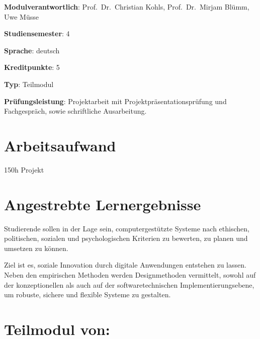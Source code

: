 \begin{modulHead}
\textbf{Modulverantwortlich}: Prof.~Dr.~Christian
Kohls, Prof.~Dr.~Mirjam Blümm, Uwe
Müsse
\end{modulHead}
\begin{modulHead}
\textbf{Studiensemester}:
4
\end{modulHead}
\begin{modulHead}
\textbf{Sprache}:
deutsch
\end{modulHead}
\begin{modulHead}
\textbf{Kreditpunkte}:
5
\end{modulHead}
\begin{modulHead}
\textbf{Typ}:
Teilmodul
\end{modulHead}
\begin{modulHead}
\textbf{Prüfungsleistung}:
Projektarbeit mit Projektpräsentationsprüfung und Fachgespräch, sowie
schriftliche Ausarbeitung.
\end{modulHead}


\hypertarget{arbeitsaufwandpathlabelmi-2017modulbeschreibungen-bachelorba_sc_projekt}{%
\section*{Arbeitsaufwand\label{/mi-2017/modulbeschreibungen-bachelor/BA_SC_Projekt}}\label{arbeitsaufwandpathlabelmi-2017modulbeschreibungen-bachelorba_sc_projekt}}

150h Projekt

\hypertarget{angestrebte-lernergebnissepathlabelmi-2017modulbeschreibungen-bachelorba_sc_projekt}{%
\section*{Angestrebte
Lernergebnisse\label{/mi-2017/modulbeschreibungen-bachelor/BA_SC_Projekt}}\label{angestrebte-lernergebnissepathlabelmi-2017modulbeschreibungen-bachelorba_sc_projekt}}

Studierende sollen in der Lage sein, computergestützte Systeme nach
ethischen, politischen, sozialen und psychologischen Kriterien zu
bewerten, zu planen und umsetzen zu können.

Ziel ist es, soziale Innovation durch digitale Anwendungen entstehen zu
lassen. Neben den empirischen Methoden werden Designmethoden vermittelt,
sowohl auf der konzeptionellen als auch auf der softwaretechnischen
Implementierungsebene, um robuste, sichere und flexible Systeme zu
gestalten.

\hypertarget{teilmodul-vonpathlabelmi-2017modulbeschreibungen-bachelorba_sc_projekt}{%
\section*{Teilmodul
von:\label{/mi-2017/modulbeschreibungen-bachelor/BA_SC_Projekt}}\label{teilmodul-vonpathlabelmi-2017modulbeschreibungen-bachelorba_sc_projekt}}

